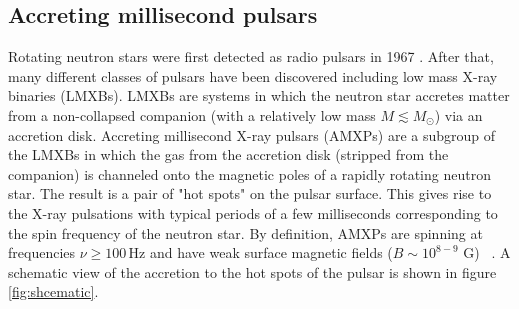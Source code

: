 \documentclass{wihuri}
\begin{document}


 



\subsection{Accreting millisecond pulsars}






Rotating neutron stars were first detected as radio pulsars in 1967 \cite{gold68}. %
After that, many different classes of pulsars have been discovered including low mass X-ray binaries (LMXBs). LMXBs are systems in which the neutron star accretes matter from a non-collapsed companion (with a relatively low mass $M \lesssim  M_{\odot}$) via an accretion disk. Accreting millisecond X-ray pulsars (AMXPs) are a subgroup of the LMXBs in which the gas from the accretion disk (stripped from the companion) is channeled onto the magnetic poles of a rapidly rotating neutron star. The result is a pair of "hot spots" on the pulsar surface.  This gives rise to the X-ray pulsations with typical periods of a few milliseconds corresponding to the spin frequency of the neutron star. By definition, AMXPs are spinning at frequencies $\nu \ge 100 \, \mathrm{Hz}$ and have weak surface magnetic fields ($B \sim 10^{8-9}$ G) ~\cite{patruno}. A schematic view of the accretion to the hot spots of the pulsar is shown in figure \ref{fig:shcematic}.
\end{document}
